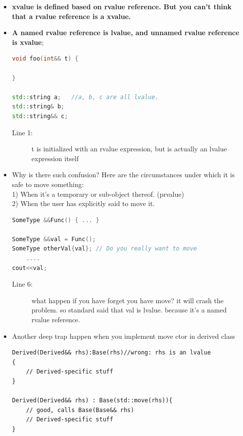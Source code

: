 \documentclass[a4paper,11pt,twoside]{book}
\begin{document}
\begin{itemize}
	\item \textbf{xvalue is defined based on rvalue reference. But you can't think that a rvalue reference is a xvalue. }
	
	\item \textbf{A named rvalue reference is lvalue, and unnamed rvalue reference is xvalue};
	
\begin{lstlisting}[frame=single, language=c++,mathescape=true]
void foo(int&& t) {

}
	
std::string a;   //a, b, c are all lvalue.
std::string& b;
std::string&& c;
\end{lstlisting}
\begin{description}
	\item[Line 1:] t is initialized with an rvalue expression, but is actually an lvalue expression itself
\end{description}
	

	\item Why is there such confusion? Here are the circumstances under which it is safe to move something:\\
	1) When it's a temporary or sub-object thereof. (prvalue) \\
	2) When the user has explicitly said to move it.
\begin{lstlisting}[frame=single, language=c++]
SomeType &&Func() { ... }
	
SomeType &&val = Func();
SomeType otherVal{val}; // Do you really want to move 
	....
cout<<val; 
\end{lstlisting}
\begin{description}
	\item[Line 6:] what happen if you have forget you have move? it will crash the problem. so standard said that val is lvalue. because it's a named rvalue reference.
\end{description}
	
\item Another deep trap happen when you implement move ctor in derived class
\begin{lstlisting}[numbers=none]
Derived(Derived&& rhs):Base(rhs)//wrong: rhs is an lvalue
{
	// Derived-specific stuff
}
	
Derived(Derived&& rhs) : Base(std::move(rhs)){
	// good, calls Base(Base&& rhs)
	// Derived-specific stuff
}
\end{lstlisting}
	
\end{itemize}
\end{document}
